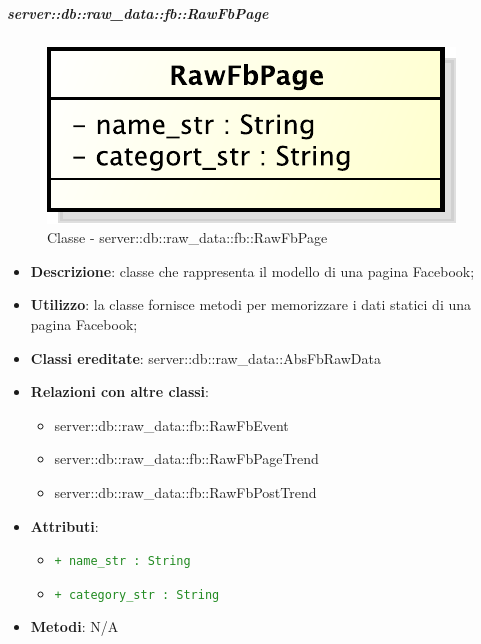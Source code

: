 			\subparagraph{server::db::raw\_data::fb::RawFbPage} %
			\label{subp:server_db_raw_data_fb_rawfbpage}			
				\begin{figure}[htbp]
					\centering
					\centerline{\includegraphics[scale=0.75]{./images/server/classes/db/raw_fb_page.pdf}}
					\caption{Classe - server::db::raw\_data::fb::RawFbPage}
				\end{figure}
				\begin{itemize}
					\item \textbf{Descrizione}: classe che rappresenta il modello di una pagina Facebook;
					\item \textbf{Utilizzo}: la classe fornisce metodi per memorizzare i dati statici di una pagina Facebook;
					\item \textbf{Classi ereditate}: server::db::raw\_data::AbsFbRawData
					\item \textbf{Relazioni con altre classi}:
						\begin{itemize}
							\item server::db::raw\_data::fb::RawFbEvent
							\item server::db::raw\_data::fb::RawFbPageTrend
							\item server::db::raw\_data::fb::RawFbPostTrend
						\end{itemize}
					\item \textbf{Attributi}:
					\begin{itemize}
						\item \textcolor{forestgreen}{\texttt{+ name\_str : String}}
						\item \textcolor{forestgreen}{\texttt{+ category\_str : String}}
					\end{itemize}
					\item \textbf{Metodi}: N/A
				\end{itemize}

